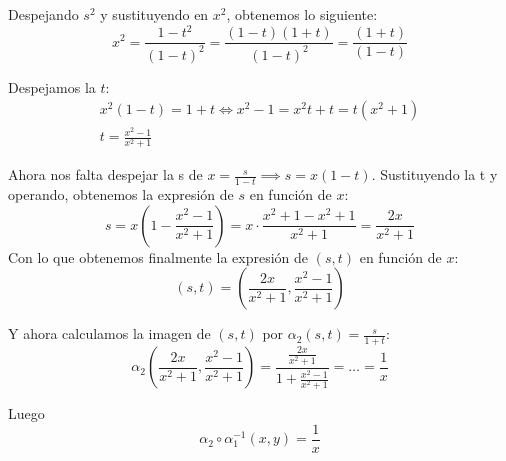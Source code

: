 Despejando $s^2$ y sustituyendo en $x^2$, obtenemos lo siguiente:
\[ x^2 = \frac{1 - t^2}{(1-t)^2} = \frac{(1-t)(1+t)}{(1-t)^2} = \frac{(1+t)}{(1-t)} \]

Despejamos la $t$:
\begin{gather*}
	x^2(1-t) = 1+t \iff x^2 - 1 = x^2t + t = t(x^2 + 1)\\
	t = \frac{x^2 - 1}{x^2 + 1}
\end{gather*}

Ahora nos falta despejar la s de $x = \frac{s}{1-t} \implies s = x (1-t)$. Sustituyendo la t y operando, obtenemos la expresión de $s$ en función de $x$:
\[ s = x \left(1 - \frac{x^2-1}{x^2+1}\right) = x \cdot \frac{x^2 + 1 - x^2 + 1}{x^2+1} = \frac{2x}{x^2+1} \]
Con lo que obtenemos finalmente la expresión de $(s,t)$ en función de $x$:
\[ (s,t) = \left(\frac{2x}{x^2+1}, \frac{x^2-1}{x^2+1}\right) \]

Y ahora calculamos la imagen de $(s,t)$ por $\alpha_2(s,t) = \frac{s}{1+t}$:
\[ \alpha_2\left(\frac{2x}{x^2+1},\frac{x^2-1}{x^2+1}\right) = \frac{\frac{2x}{x^2+1}}{1+\frac{x^2-1}{x^2+1}} = \dots = \frac{1}{x} \]

Luego
\[ \alpha_2 \circ \alpha_1^{-1}(x,y) = \frac{1}{x} \]
